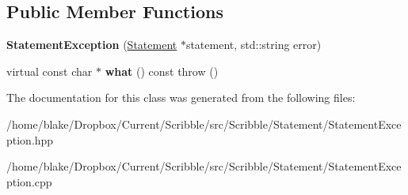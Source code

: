 \subsection*{Public Member Functions}
\begin{DoxyCompactItemize}
\item 
\hypertarget{class_scribble_core_1_1_statement_exception_a6dadbce104fa804c5874d6f5ee221d26}{{\bfseries Statement\-Exception} (\hyperlink{class_scribble_core_1_1_statement}{Statement} $\ast$statement, std\-::string error)}\label{class_scribble_core_1_1_statement_exception_a6dadbce104fa804c5874d6f5ee221d26}

\item 
\hypertarget{class_scribble_core_1_1_statement_exception_a6b6755a02d6cbca86a0b61916f35d7e8}{virtual const char $\ast$ {\bfseries what} () const   throw ()}\label{class_scribble_core_1_1_statement_exception_a6b6755a02d6cbca86a0b61916f35d7e8}

\end{DoxyCompactItemize}


The documentation for this class was generated from the following files\-:\begin{DoxyCompactItemize}
\item 
/home/blake/\-Dropbox/\-Current/\-Scribble/src/\-Scribble/\-Statement/Statement\-Exception.\-hpp\item 
/home/blake/\-Dropbox/\-Current/\-Scribble/src/\-Scribble/\-Statement/Statement\-Exception.\-cpp\end{DoxyCompactItemize}
